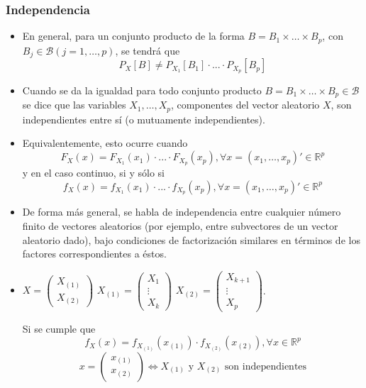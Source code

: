 \documentclass[11pt,a4paper]{article}
\begin{document}
\subsubsection{Independencia}
\begin{itemize}
\item En general, para un conjunto producto de la forma $B = B_{1} \times \dots \times B_{p}$, con $B_{j} \in \mathcal{B} (j = 1, \dots, p)$, se tendrá que
$$P_{X}[B] \neq P_{X_{1}}[B_{1}] \cdot ... \cdot P_{X_{p}}[B_{p}]$$

\item Cuando se da la igualdad para todo conjunto producto $B = B_{1} \times \dots \times B_{p} \in \mathcal{B}$ se dice que las variables $X_{1}, \dots, X_{p}$, componentes del vector aleatorio $X$, son independientes entre sí (o mutuamente independientes).

\item Equivalentemente, esto ocurre cuando
$$F_{X}(x) = F_{X_{1}}(x_{1}) \cdot ... \cdot F_{X_{p}}(x_{p}), \forall x = (x_{1}, \dots, x_{p})' \in \mathbb{R}^{p}$$
y en el caso continuo, si y sólo si
$$f_{X}(x) = f_{X_{1}}(x_{1}) \cdot ... \cdot f_{X_{p}}(x_{p}), \forall x = (x_{1}, \dots, x_{p})' \in \mathbb{R}^{p}$$

\item De forma más general, se habla de independencia entre cualquier número finito de vectores aleatorios (por ejemplo, entre subvectores de un vector aleatorio dado), bajo condiciones de factorización similares en términos de los factores correspondientes a éstos.

\item $X = \begin{pmatrix} X_{(1)} \\ X_{(2)} \end{pmatrix}$ \hspace{2cm} $X_{(1)} = \begin{pmatrix} X_{1} \\ \vdots \\ X_{k} \end{pmatrix}$ \hspace{1cm} $X_{(2)} = \begin{pmatrix} X_{k+1} \\ \vdots \\ X_{p} \end{pmatrix}$.

Si se cumple que
$$f_{X}(x) = f_{X_{(1)}}(x_{(1)}) \cdot f_{X_{(2)}}(x_{(2)}), \forall x \in \mathbb{R}^{p}$$
$$x = \begin{pmatrix} x_{(1)} \\ x_{(2)} \end{pmatrix} \iff X_{(1)} \text{ y } X_{(2)} \text{ son independientes}$$


\end{itemize}
\end{document}
